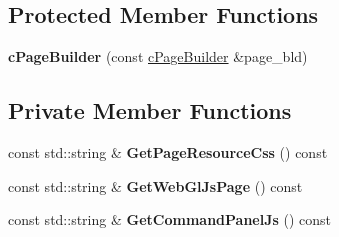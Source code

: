 \subsection*{\-Protected \-Member \-Functions}
\begin{DoxyCompactItemize}
\item 
\hypertarget{classhttp__server_1_1cPageBuilder_a3f3d04425b2f912c5616362b9be5d19e}{{\bfseries c\-Page\-Builder} (const \hyperlink{classhttp__server_1_1cPageBuilder}{c\-Page\-Builder} \&page\-\_\-bld)}\label{classhttp__server_1_1cPageBuilder_a3f3d04425b2f912c5616362b9be5d19e}

\end{DoxyCompactItemize}
\subsection*{\-Private \-Member \-Functions}
\begin{DoxyCompactItemize}
\item 
\hypertarget{classhttp__server_1_1cPageBuilder_af13a8d2da68df5dcb3e5804f968ac2cd}{const std\-::string \& {\bfseries \-Get\-Page\-Resource\-Css} () const }\label{classhttp__server_1_1cPageBuilder_af13a8d2da68df5dcb3e5804f968ac2cd}

\item 
\hypertarget{classhttp__server_1_1cPageBuilder_a5ebfe434b953025cced089248bb64bf2}{const std\-::string \& {\bfseries \-Get\-Web\-Gl\-Js\-Page} () const }\label{classhttp__server_1_1cPageBuilder_a5ebfe434b953025cced089248bb64bf2}

\item 
\hypertarget{classhttp__server_1_1cPageBuilder_ad42b2d53306216563fa70f7fa1bd1cae}{const std\-::string \& {\bfseries \-Get\-Command\-Panel\-Js} () const }\label{classhttp__server_1_1cPageBuilder_ad42b2d53306216563fa70f7fa1bd1cae}

\end{DoxyCompactItemize}
